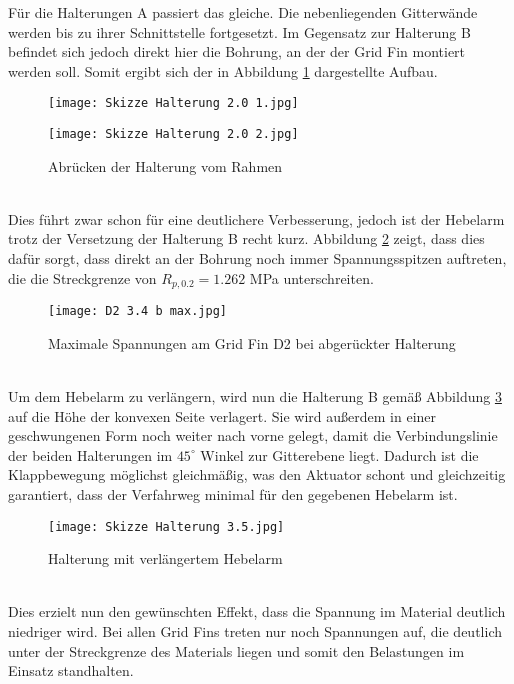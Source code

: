 Für die Halterungen A passiert das gleiche. Die nebenliegenden Gitterwände werden bis zu ihrer Schnittstelle fortgesetzt. Im Gegensatz zur Halterung B befindet sich jedoch direkt hier die Bohrung, an der der Grid Fin montiert werden soll. Somit ergibt sich der in Abbildung \ref{abb_V2-Halterung} dargestellte Aufbau.
\begin{figure}[h]
	\begin{minipage}[t]{0.45\linewidth}
		\centering
		\texttt{[image: Skizze Halterung 2.0 1.jpg]}
	\end{minipage}
	\hfill
	\begin{minipage}[t]{0.45\linewidth}
		\centering
		\texttt{[image: Skizze Halterung 2.0 2.jpg]}
	\end{minipage}
	\caption{Abrücken der Halterung vom Rahmen}
	\label{abb_V2-Halterung}
\end{figure}\\
Dies führt zwar schon für eine deutlichere Verbesserung, jedoch ist der Hebelarm trotz der Versetzung der Halterung B recht kurz. Abbildung \ref{abb_V2-D2} zeigt, dass dies dafür sorgt, dass direkt an der Bohrung noch immer Spannungsspitzen auftreten, die die Streckgrenze von $R_{p, 0.2} = 1.262$ MPa unterschreiten.
\begin{figure}[h]
	\centering
	\texttt{[image: D2 3.4 b max.jpg]}
	\caption{Maximale Spannungen am Grid Fin D2 bei abgerückter Halterung}
	 \label{abb_V2-D2}
\end{figure}\\
Um dem Hebelarm zu verlängern, wird nun die Halterung B gemäß Abbildung \ref{abb_V3-Halterung} auf die Höhe der konvexen Seite verlagert. Sie wird außerdem in einer geschwungenen Form noch weiter nach vorne gelegt, damit die Verbindungslinie der beiden Halterungen im $45^\circ$ Winkel zur Gitterebene liegt. Dadurch ist die Klappbewegung möglichst gleichmäßig, was den Aktuator schont und gleichzeitig garantiert, dass der Verfahrweg minimal für den gegebenen Hebelarm ist.
\begin{figure}[h] 
	\centering
	\texttt{[image: Skizze Halterung 3.5.jpg]}
	\caption{Halterung mit verlängertem Hebelarm}
	\label{abb_V3-Halterung}
\end{figure}\\
Dies erzielt nun den gewünschten Effekt, dass die Spannung im Material deutlich niedriger wird. Bei allen Grid Fins treten nur noch Spannungen auf, die deutlich unter der Streckgrenze des Materials liegen und somit den Belastungen im Einsatz standhalten.
